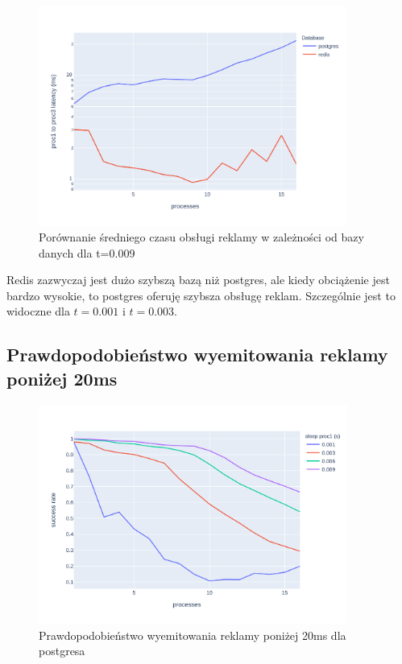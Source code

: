 \documentclass[polish, 10pt]{article}
\begin{document}
\begin{figure}[H]
    \centering
    \includegraphics[width=0.9\textwidth]{./graphs/diff_in_end_postgres_vs_redis0009.png}
    \caption{Porównanie średniego czasu obsługi reklamy w zależności od bazy danych dla t=0.009}
\end{figure}

Redis zazwyczaj jest dużo szybszą bazą niż postgres, ale kiedy obciążenie jest bardzo wysokie, to postgres oferuję szybsza obsługę reklam. Szczególnie jest to widoczne dla $t=0.001$ i $t=0.003$.


\subsection{Prawdopodobieństwo wyemitowania reklamy poniżej 20ms}

\begin{figure}[H]
    \centering
    \includegraphics[width=0.9\textwidth]{./graphs/success_rate_postgres_all_sleeps.png}
    \caption{Prawdopodobieństwo wyemitowania reklamy poniżej 20ms dla postgresa}
\end{figure}
\end{document}
